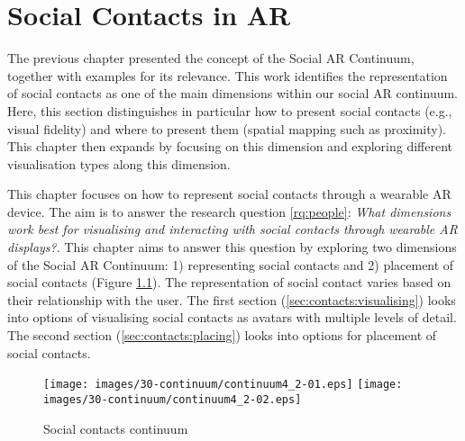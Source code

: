 \chapter{Social Contacts in AR}
\label{ch:contacts} 

The previous chapter presented the concept of the Social AR Continuum, together with examples for its relevance. This work identifies the representation of social contacts as one of the main dimensions within our social AR continuum. Here, this section distinguishes in particular how to present social contacts (e.g., visual fidelity) and where to present them (spatial mapping such as proximity). This chapter then expands by focusing on this dimension and exploring different visualisation types along this dimension. 

This chapter focuses on how to represent social contacts through a wearable AR device. The aim is to answer the research question \ref{rq:people}: \textit{What dimensions work best for visualising and interacting with social contacts through wearable AR displays?}. This chapter aims to answer this question by exploring two dimensions of the Social AR Continuum: 1) representing social contacts and 2) placement of social contacts (Figure \ref{fig:contacts:contacts-continuum}). The representation of social contact varies based on their relationship with the user. 
The first section (\ref{sec:contacts:visualising}) looks into options of visualising social contacts as avatars with multiple levels of detail. The second section (\ref{sec:contacts:placing}) looks into options for placement of social contacts. 

\begin{figure}[ht]
  \centering
  \texttt{[image: images/30-continuum/continuum4\_2-01.eps]}
  \texttt{[image: images/30-continuum/continuum4\_2-02.eps]}
  \caption{Social contacts continuum}
  \label{fig:contacts:contacts-continuum}
\end{figure}





